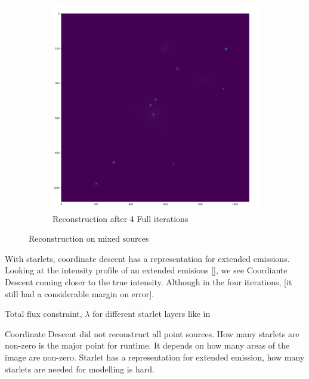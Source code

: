 \begin{figure}[h]
\begin{subfigure}[b]{0.4\linewidth}
		\includegraphics[width=\linewidth]{./chapters/05.algorithms/results/image4.png}
		\caption{Reconstruction after 4 Full iterations}
		\label{results:g55:nrao:dirty}
	\end{subfigure}
	\caption{Reconstruction on mixed sources}
	\label{results:mixed}
\end{figure}

With starlets, coordinate descent has a representation for extended emissions. Looking at the intensity profile of an extended emisions \ref{}, we see Coordiante Descent coming closer to the true intensity. Although in the four iterations,  [it still had a considerable margin on error]. 

Total flux constraint, $\lambda$ for different starlet layers like in \cite{girard2015sparse}

Coordinate Descent did not reconstruct all point sources. How many starlets are non-zero is the major point for runtime. It depends on how many areas of the image are non-zero. Starlet has a representation for extended emission, how many starlets are needed for modelling is hard.





